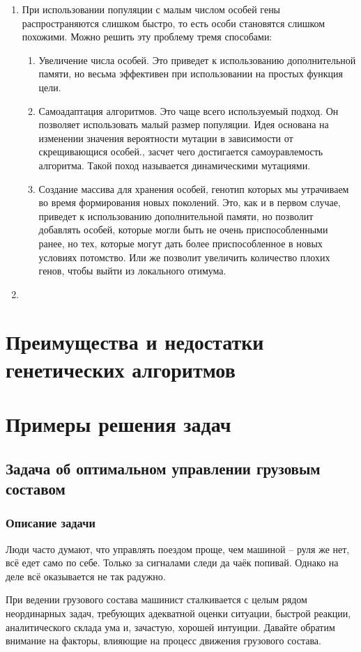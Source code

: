 \begin{enumerate}
\item При использовании популяции с малым числом особей гены распространяются слишком быстро, то есть особи становятся слишком похожими. Можно решить эту проблему тремя способами:
	 \begin{enumerate}
	\item Увеличение числа особей. Это приведет к использованию дополнительной памяти, но весьма эффективен при использовании на простых функция цели.
	\item Самоадаптация алгоритмов. Это чаще всего используемый подход. Он позволяет использовать малый размер популяции. Идея основана на изменении значения вероятности мутации в зависимости от скрещивающися особей., засчет чего достигается самоуравлемость алгоритма. Такой поход называется динамическими мутациями.
	 \item Создание массива для хранения особей, генотип которых мы утрачиваем во время формирования новых поколений. Это, как и в первом случае, приведет к использованию дополнительной памяти, но позволит добавлять особей, которые могли быть не очень приспособленными ранее, но тех, которые могут дать более приспособленное в новых условиях потомство. Или же позволит увеличить количество плохих генов, чтобы выйти из локального отимума. 
	\end{enumerate}
\item 
\end{enumerate}
\chapter{Преимущества и недостатки генетических алгоритмов}
\chapter{Примеры решения задач}
\section{Задача об оптимальном управлении грузовым составом}
\subsection{Описание задачи}
Люди часто думают, что управлять поездом проще, чем машиной -- руля же нет, всё едет само по себе. Только за сигналами следи да чаёк попивай.
Однако на деле всё оказывается не так радужно.

При ведении грузового состава машинист сталкивается с целым рядом неординарных задач, требующих адекватной оценки ситуации, быстрой реакции, аналитического склада ума и, зачастую, хорошей интуиции.
Давайте обратим внимание на факторы, влияющие на процесс движения грузового состава.

